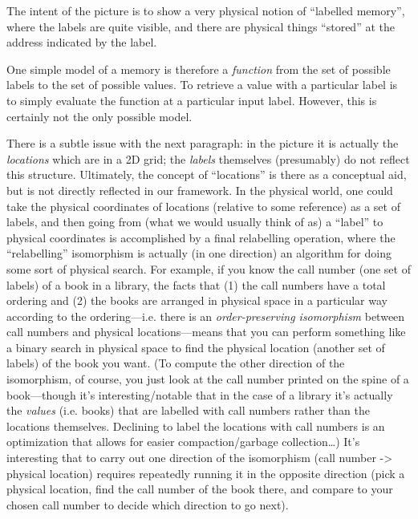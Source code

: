 \documentclass{jfp}
\begin{document}
\begin{commentary}
  The intent of the picture is to show a very physical
notion of ``labelled memory'', where the labels are quite
visible, and there are physical things ``stored'' at the address
indicated by the label.
\end{commentary}

One simple model of a memory is therefore a \emph{function} from the
set of possible labels to the set of possible values. To retrieve a
value with a particular label is to simply evaluate the function at a
particular input label.  However, this is certainly not the only
possible model.

\begin{commentary}
  There is a subtle issue with the next paragraph: in the picture it
  is actually the \emph{locations} which are in a 2D grid; the
  \emph{labels} themselves (presumably) do not reflect this structure.
  Ultimately, the concept of ``locations'' is there as a conceptual
  aid, but is not directly reflected in our framework.  In the
  physical world, one could take the physical coordinates of locations
  (relative to some reference) as a set of labels, and then going from
  (what we would usually think of as) a ``label'' to physical
  coordinates is accomplished by a final relabelling operation, where
  the ``relabelling'' isomorphism is actually (in one direction) an
  algorithm for doing some sort of physical search.  For example, if
  you know the call number (one set of labels) of a book in a library,
  the facts that (1) the call numbers have a total ordering and (2)
  the books are arranged in physical space in a particular way
  according to the ordering---i.e. there is an \emph{order-preserving
    isomorphism} between call numbers and physical locations---means
  that you can perform something like a binary search in physical
  space to find the physical location (another set of labels) of the
  book you want.  (To compute the other direction of the isomorphism,
  of course, you just look at the call number printed on the spine of
  a book---though it's interesting/notable that in the case of a
  library it's actually the \emph{values} (i.e. books) that are
  labelled with call numbers rather than the locations themselves.
  Declining to label the locations with call numbers is an
  optimization that allows for easier compaction/garbage
  collection\dots) It's interesting that to carry out one direction of
  the isomorphism (call number -> physical location) requires
  repeatedly running it in the opposite direction (pick a physical
  location, find the call number of the book there, and compare to
  your chosen call number to decide which direction to go next).


\end{commentary}
\end{document}
